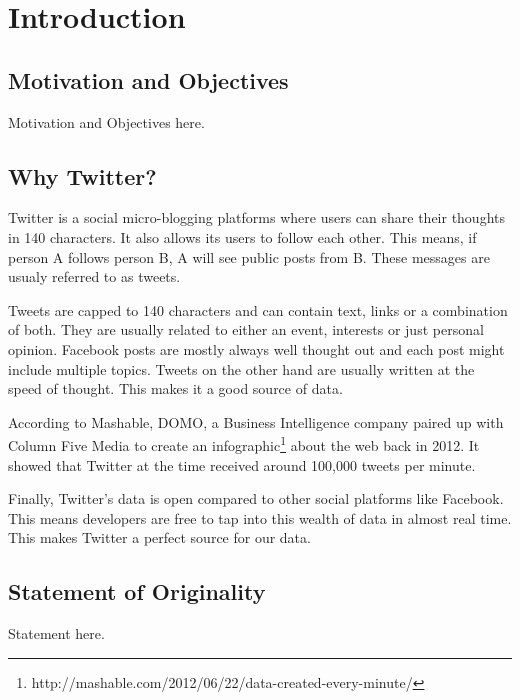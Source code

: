 
\chapter{Introduction}

\section{Motivation and Objectives}

Motivation and Objectives here.


\section{Why Twitter?}
Twitter is a social micro-blogging platforms where users can share their thoughts in 140 characters.
It also allows its users to follow each other. This means, if person A follows person B, A will see
public posts from B. These messages are usualy referred to as tweets.

Tweets are capped to 140 characters and can contain text, links or a combination of both. They are
usually related to either an event, interests or just personal opinion. Facebook posts are mostly
always well thought out and each post might include multiple topics. Tweets on the other hand are
usually written at the speed of thought. This makes it a good source of data.

According to Mashable, DOMO, a Business Intelligence company paired up with Column Five Media to
create an infographic\footnote{http://mashable.com/2012/06/22/data-created-every-minute/} about the
web back in 2012. It showed that Twitter at the time received around 100,000 tweets per minute.

Finally, Twitter's data is open compared to other social platforms like Facebook. This means
developers are free to tap into this wealth of data in almost real time. This makes Twitter a
perfect source for our data.


\section{Statement of Originality}

Statement here.

